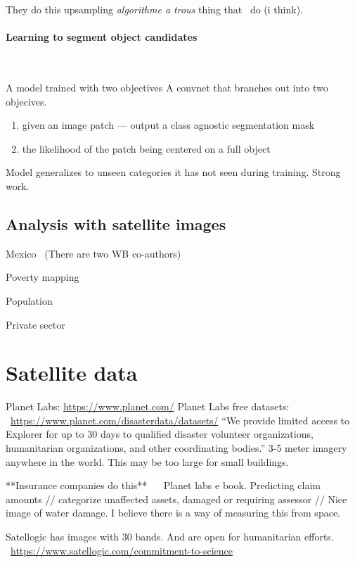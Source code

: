 \documentclass[12pt, a4paper, oneside, headinclude, footinclude]{article}
\begin{document}
They do this upsampling \textit{algorithme a trous} thing that~\cite{NIPS2015_5852}
do (i think).

\paragraph{Learning to segment object candidates}~\cite{NIPS2015_5852}

A model trained with two objectives
A convnet that branches out into two objecives.

\begin{enumerate}
    \item given an image patch ---  output a class agnostic segmentation mask
    \item the likelihood of the patch being centered on a full object
\end{enumerate}

Model generalizes to unseen categories it has not seen during training. Strong
work.



\subsection{Analysis with satellite images}

Mexico~\cite{babenko2017poverty} (There are two WB co-authors)

Poverty mapping~\cite{Jean790}

Population~\cite{doupe2016, robinson2017}

Private sector~\cite{facebook, cnn_orbital}

\section{Satellite data}

Planet Labs: \url{https://www.planet.com/}
Planet Labs free datasets:
~\url{https://www.planet.com/disasterdata/datasets/}
    ``We provide limited access to Explorer for up to 30 days to qualified disaster
    volunteer organizations, humanitarian organizations, and other coordinating
    bodies.''
3-5 meter imagery anywhere in the world. This may be too large for small
buildings.

**Insurance companies do this** ~~ Planet labs e book.
Predicting claim amounts // categorize unaffected assets, damaged or requiring
assessor // 
Nice image of water damage. I believe there is a way of measuring this from
space.

Satellogic has images with 30 bands. And are open for humanitarian efforts. ~\url{https://www.satellogic.com/commitment-to-science}
\end{document}
